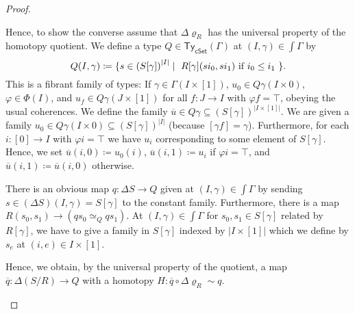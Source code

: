 \documentclass[10pt,a4paper]{article}
\newcommand{\cSet}{\mathsf{cSet}}
\newcommand\Ty{\mathsf{Ty}}
\DeclarePairedDelimiter\set{\{}{\}}
\begin{document}
\begin{proof}
\begin{description}[font=\normalfont,leftmargin=0cm]
    Hence, to show the converse assume that \(\Delta \varrho_{R}\) has the universal property of the homotopy quotient.
    We define a type \(Q \in \Ty_{\cSet}(\Gamma)\) at \((I, \gamma) \in \int\Gamma\) by
    \[
      Q(I, \gamma) \coloneqq \set{ s \in {(S[\gamma])}^{|I|} \mid \text{ \(R[\gamma](si_0, si_1)\) if \(i_0 \leq i_1\) } }.
    \]
    This is a fibrant family of types: If \(\gamma \in \Gamma(I \times [1])\), \(u_0 \in Q\gamma(I \times 0)\), \(\varphi \in \Phi(I)\), and \(u_f \in Q\gamma(J \times [1])\) for all \(f \colon J \to I\) with \(\varphi f = \top\), obeying the usual coherences.
    We define the family \(\overline u \in Q\gamma \subseteq {(S[\gamma])}^{|I \times [1]|}\).
    We are given a family \(u_0 \in Q\gamma(I \times 0) \subseteq {(S[\gamma])}^{|I|}\) (because \([\gamma f] = \gamma\)).
    Furthermore, for each \(i \colon [0] \to I\) with \(\varphi i = \top\) we have \(u_i\) corresponding to some element of \(S[\gamma]\).
    Hence, we set \(\overline u(i, 0) \coloneqq u_0(i)\), \(\overline u(i, 1) \coloneqq u_i\) if \(\varphi i = \top\), and \(\overline u(i, 1) \coloneqq \overline u(i, 0)\) otherwise.

    There is an obvious map \(q \colon \Delta S \to Q\) given at \((I, \gamma) \in \int\Gamma\) by sending \(s \in (\Delta S)(I, \gamma) = S[\gamma]\) to the constant family.
    Furthermore, there is a map \(R(s_0, s_1) \to (qs_0 \simeq_{Q} qs_1)\).
    At \((I, \gamma) \in \int\Gamma\) for \(s_0, s_1 \in S[\gamma]\) related by \(R[\gamma]\), we have to give a family in \(S[\gamma]\) indexed by \(|I \times [1]|\) which we define by \(s_e\) at \((i, e) \in I \times [1]\).

    Hence, we obtain, by the universal property of the quotient, a map \(\overline q \colon \Delta(S/R) \to Q\) with a homotopy \(H \colon \overline q \circ \Delta\varrho_R \sim q\).
  \end{description}
\end{proof}

\end{document}
